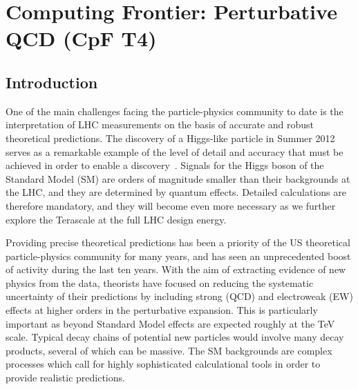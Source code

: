

\chapter{Computing Frontier: Perturbative QCD (CpF T4)}
\label{chap:T4}


\begin{center}\begin{boldmath}



\end{boldmath}\end{center}





\section{Introduction}

One of the main challenges facing the particle-physics community to date
is the interpretation of LHC measurements on the basis of accurate and
robust theoretical predictions.  The discovery of a Higgs-like
particle in Summer 2012~\cite{Aad:2012tfa,Chatrchyan:2012ufa} serves
as a remarkable example of the level of detail and accuracy that must
be achieved in order to enable a
discovery~\cite{Dittmaier:2011ti,Dittmaier:2012vm,Heinemeyer:2013tqa}.
Signals for the Higgs boson of the Standard Model (SM) are orders of 
magnitude smaller than their backgrounds at the LHC, and they are 
determined by quantum effects.  Detailed calculations are therefore 
mandatory, and they will become even more necessary as we further 
explore the Terascale at the full LHC design energy.

Providing precise theoretical predictions has been a priority of the US 
theoretical particle-physics community for many years, and has seen an
unprecedented boost of activity during the last ten years. With the
aim of extracting evidence of new physics from the data, theorists
have focused on reducing the systematic uncertainty of their predictions
by including strong (QCD) and electroweak (EW) effects at higher orders
in the perturbative expansion. This is particularly important as
beyond Standard Model effects are expected roughly at the TeV scale. 
Typical decay chains of potential new particles would involve many 
decay products, several of which can be massive. The SM backgrounds 
are complex processes which call for highly sophisticated calculational 
tools in order to provide realistic predictions.

